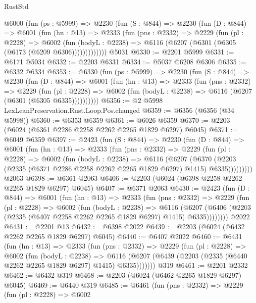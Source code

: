 \begin{lexlean}{RustStd}
\begin{coremodule}
    @6000
      (fun (ps : @5999) =>
      @2230
        (fun (S : @844) =>
        @2230
          (fun (D : @844) =>
          @6001
            (fun (hn : @13) =>
            @2333
              (fun (pns : @2332) =>
              @2229
                (fun (pl : @2228) =>
                @6002
                  (fun (bodyL : @2238) =>
                  @6116 (@6207 (@6301 (@6305 (@6173 (@6209 @6306)))))))))))))
    @5031
@6330 := @2201 @5999
@6331 := @6171 @5034
@6332 := @2203 @6331
@6334 := @5037 @6208 @6306
@6335 := @6332 @6334
@6353 := @6330
    (fun (ps : @5999) =>
    @2230
      (fun (S : @844) =>
      @2230
        (fun (D : @844) =>
        @6001
          (fun (hn : @13) =>
          @2333
            (fun (pns : @2332) =>
            @2229
              (fun (pl : @2228) =>
              @6002 (fun (bodyL : @2238) => @6116 (@6207 (@6301 (@6305 @6335))))))))))
@6356 := @2 @5998 LexLeanPreservation.Rust.Loop.Pos.changed
@6359 := @6356 (@6356 (@34 @5998))
@6360 := @6353 @6359
@6361 := @6026 @6359
@6370 := @2203 (@6024 (@6361 @2286 @2258 @2262 @2265 @1829 @6297) @6045)
@6371 := @6049 @6359
@6397 := @2423
    (fun (S : @844) =>
    @2230
      (fun (D : @844) =>
      @6001
        (fun (hn : @13) =>
        @2333
          (fun (pns : @2332) =>
          @2229
            (fun (pl : @2228) =>
            @6002
              (fun (bodyL : @2238) =>
              @6116
                (@6207
                  (@6370
                    (@2203 (@2335 (@6371 @2286 @2258 @2262 @2265 @1829 @6297) @1415) @6335)))))))))
    @2063
@6398 := @6361 @2063
@6406 := @2203 (@6024 (@6398 @2258 @2262 @2265 @1829 @6297) @6045)
@6407 := @6371 @2063
@6430 := @2423
    (fun (D : @844) =>
    @6001
      (fun (hn : @13) =>
      @2333
        (fun (pns : @2332) =>
        @2229
          (fun (pl : @2228) =>
          @6002
            (fun (bodyL : @2238) =>
            @6116
              (@6207 (@6406 (@2203 (@2335 (@6407 @2258 @2262 @2265 @1829 @6297) @1415) @6335))))))))
    @2022
@6431 := @2201 @13
@6432 := @6398 @2022
@6439 := @2203 (@6024 (@6432 @2262 @2265 @1829 @6297) @6045)
@6440 := @6407 @2022
@6460 := @6431
    (fun (hn : @13) =>
    @2333
      (fun (pns : @2332) =>
      @2229
        (fun (pl : @2228) =>
        @6002
          (fun (bodyL : @2238) =>
          @6116 (@6207 (@6439 (@2203 (@2335 (@6440 @2262 @2265 @1829 @6297) @1415) @6335)))))))
    @319
@6461 := @2201 @2332
@6462 := @6432 @319
@6468 := @2203 (@6024 (@6462 @2265 @1829 @6297) @6045)
@6469 := @6440 @319
@6485 := @6461
    (fun (pns : @2332) =>
    @2229
      (fun (pl : @2228) =>
      @6002

\end{coremodule}
\end{lexlean}
